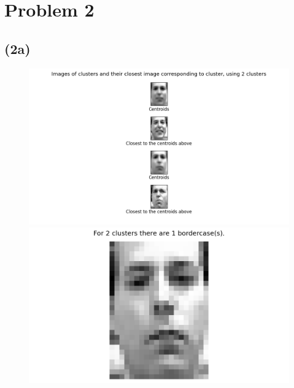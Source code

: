 \documentclass[12pt, letterpaper]{article}
\begin{document}
  \section*{Problem 2}
    \subsection*{(2a)}
      \begin{figure}[H]
        \caption{}
        \centering
        \includegraphics[scale=0.7]{cluster2}
        \includegraphics[scale=0.4]{border2}
      \end{figure}\\
\end{document}
